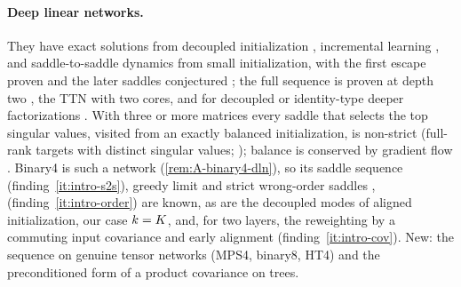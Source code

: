 \paragraph{Deep linear networks.} They have exact solutions from decoupled initialization
\citep{saxe2014exact,saxe2019mathematical}, incremental learning
\citep{gidel2019implicit,gissin2020implicit,arora2019implicit,li2021towards}, and saddle-to-saddle
dynamics from small initialization, with the first escape proven and the later saddles conjectured
\citep{jacot2022saddletosaddle}; the full sequence is proven at depth two \citep{jiang2023algorithmic},
the TTN with two cores, and for decoupled or identity-type deeper factorizations
\citep{chou2024gradient}. With three or more matrices every saddle that selects the top singular values,
visited from an exactly balanced initialization, is non-strict (full-rank targets with distinct singular
values; \citealp[Thm~7 and the remark after Prop.~8]{achour2024loss}); balance is
conserved by gradient flow \citep{arora2018optimization,du2018algorithmic,kunin2021neural,marcotte2023abide}.
Binary4 is such a network (\cref{rem:A-binary4-dln}), so its saddle sequence (finding~\ref{it:intro-s2s}),
greedy limit \citep[Thm~2]{jacot2022saddletosaddle} and strict wrong-order saddles
\citep[Thm~7]{achour2024loss}, \citep[Lemma~15]{jacot2022saddletosaddle} (finding~\ref{it:intro-order}) are
known, as are the decoupled modes of aligned initialization, our case $k=K$, and, for two layers, the
reweighting by a commuting input covariance \citep[Thm~2]{gidel2019implicit} and early alignment
\citep{atanasov2022neural} (finding~\ref{it:intro-cov}). New: the sequence on genuine tensor networks
(MPS4, binary8, HT4) and the preconditioned form of a product covariance on trees.

